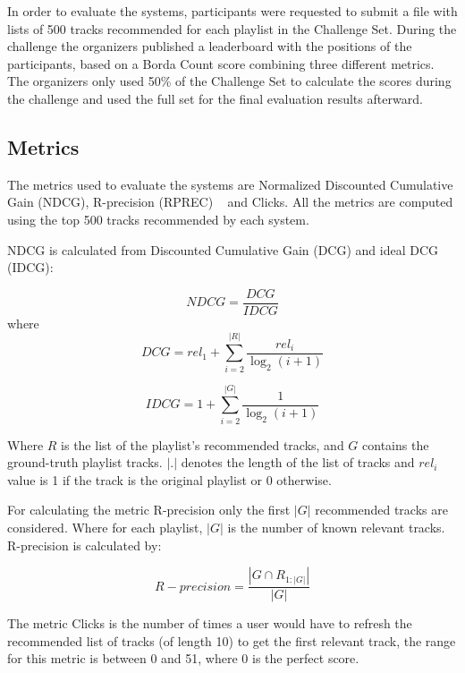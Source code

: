 In order to evaluate the systems, participants were requested to submit a file with lists of 500 tracks recommended for each playlist in the Challenge Set. During the challenge the organizers published a leaderboard with the positions of the participants, based on a Borda Count score combining three different metrics. The organizers only used 50\% of the Challenge Set to calculate the scores during the challenge and used the full set for the final evaluation results afterward.

\subsection{Metrics}

The metrics used to evaluate the systems are Normalized Discounted Cumulative Gain (NDCG), R-precision (RPREC) ~\cite{Ricci:2010:RSH:1941884} and Clicks. All the metrics are computed using the top 500 tracks recommended by each system.

NDCG is calculated from Discounted Cumulative Gain (DCG) and ideal DCG (IDCG):


\begin{displaymath}
  NDCG = \frac{DCG}{IDCG} 
\end{displaymath}
where
\begin{displaymath}
  DCG = rel_{1} + \sum_{i=2}^{|R|} \frac{rel_{i}}{\log_{2} (i+1)}
\end{displaymath}

\begin{displaymath}
  IDCG = 1 + \sum_{i=2}^{|G|} \frac{1}{\log_{2} (i+1)}
\end{displaymath}

Where $R$ is the list of the playlist's recommended tracks, and $G$ contains the ground-truth playlist tracks. $| . |$ denotes the length of the list of tracks and $rel_{i}$ value is 1 if the track is the original playlist or 0 otherwise. 

For calculating the metric R-precision only the first $|G|$ recommended tracks are considered. Where for each playlist, $|G|$ is the number of known relevant tracks. R-precision is calculated by:

\begin{displaymath}
  R-precision = \frac{|G \cap R_{1:|G|}|}{|G|}
\end{displaymath}

The metric Clicks is the number of times a user would have to refresh the recommended list of tracks (of length 10) to get the first relevant track, the range for this metric is between 0 and 51, where 0 is the perfect score.

